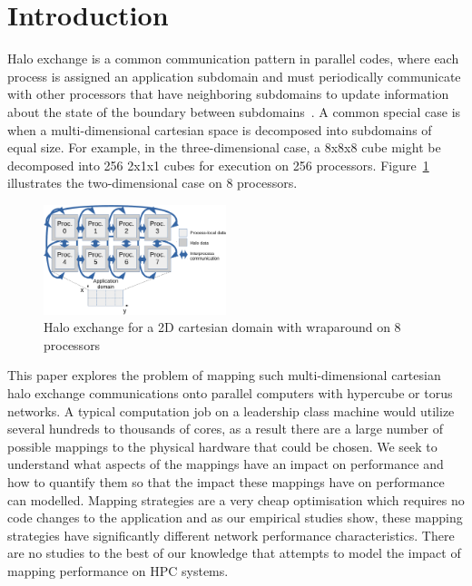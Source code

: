\documentclass{acm_proc_article-sp}
\begin{document}
\section{Introduction}

Halo exchange is a common communication pattern in parallel codes, where
each process is assigned an application subdomain and must periodically
communicate with other processors that have neighboring subdomains to
update information about the state of the boundary between subdomains~\cite{Kjolstad_2010}.
A common special case is when a multi-dimensional cartesian space is
decomposed into subdomains of equal size.  For example, in the three-dimensional
case, a 8x8x8 cube might be decomposed into 256 2x1x1 cubes for execution on 256 processors.
Figure~\ref{fig:halo-illustration} illustrates the two-dimensional case on 8
processors.

\begin{figure}
  \center
  \includegraphics[width=0.475\textwidth]{fig/halo-illustration}
  \caption{Halo exchange for a 2D cartesian domain with wraparound on 8 processors}
    \label{fig:halo-illustration}
\end{figure}

This paper explores the problem of mapping such multi-dimensional cartesian
halo exchange communications onto parallel computers with hypercube or
torus networks. A typical computation job on a leadership class machine would
utilize several hundreds to thousands of cores, as a result there are a large number of
possible mappings to the physical hardware that could be chosen. We seek to understand
what aspects of the mappings have an impact on performance and how to quantify them so
that the impact these mappings have on performance can modelled. Mapping strategies
are a very cheap optimisation which requires no code changes to the application
and as our empirical studies show, these mapping strategies have significantly
different network performance characteristics. There are no studies to the best
of our knowledge that attempts to model the impact of mapping performance on
HPC systems.
\end{document}
